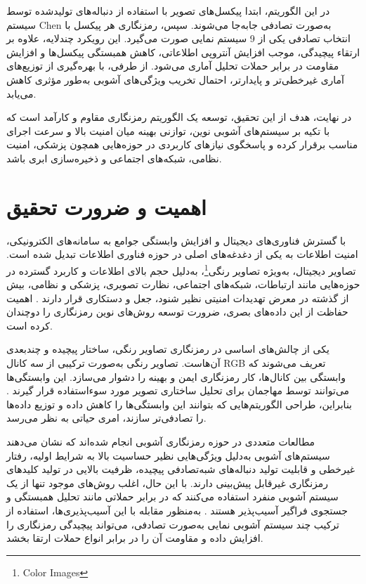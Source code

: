 \documentclass[a4paper,12pt]{report}
\renewcommand{\%}{\lr{\oldpercent}}
\providecommand{\lr}[1]{#1}
\providecommand{\LTRfootnote}[1]{\footnote{#1}}
\begin{document}
در این الگوریتم، ابتدا پیکسل‌های تصویر با استفاده از دنباله‌های تولیدشده توسط سیستم \lr{Chen} به‌صورت تصادفی جابه‌جا می‌شوند. سپس، رمزنگاری هر پیکسل با انتخاب تصادفی یکی از 9 سیستم نمایی صورت می‌گیرد. این رویکرد چندلایه، علاوه بر ارتقاء پیچیدگی، موجب افزایش آنتروپی اطلاعاتی، کاهش همبستگی پیکسل‌ها و افزایش مقاومت در برابر حملات تحلیل آماری می‌شود. از طرفی، با بهره‌گیری از توزیع‌های آماری غیرخطی‌تر و پایدارتر، احتمال تخریب ویژگی‌های آشوبی به‌طور مؤثری کاهش می‌یابد.

در نهایت، هدف از این تحقیق، توسعه یک الگوریتم رمزنگاری مقاوم و کارآمد است که با تکیه بر سیستم‌های آشوبی نوین، توازنی بهینه میان امنیت بالا و سرعت اجرای مناسب برقرار کرده و پاسخگوی نیازهای کاربردی در حوزه‌هایی همچون پزشکی، امنیت نظامی، شبکه‌های اجتماعی و ذخیره‌سازی ابری باشد.

\section{اهمیت و ضرورت تحقیق}
با گسترش فناوری‌های دیجیتال و افزایش وابستگی جوامع به سامانه‌های الکترونیکی، امنیت اطلاعات به یکی از دغدغه‌های اصلی در حوزه فناوری اطلاعات تبدیل شده است. تصاویر دیجیتال، به‌ویژه تصاویر رنگی\LTRfootnote{Color Images}، به‌دلیل حجم بالای اطلاعات و کاربرد گسترده در حوزه‌هایی مانند ارتباطات، شبکه‌های اجتماعی، نظارت تصویری، پزشکی و نظامی، بیش از گذشته در معرض تهدیدات امنیتی نظیر شنود، جعل و دستکاری قرار دارند \cite{ref10}. اهمیت حفاظت از این داده‌های بصری، ضرورت توسعه روش‌های نوین رمزنگاری را دوچندان کرده است.

یکی از چالش‌های اساسی در رمزنگاری تصاویر رنگی، ساختار پیچیده و چندبعدی آن‌هاست. تصاویر رنگی به‌صورت ترکیبی از سه کانال \lr{RGB} تعریف می‌شوند که وابستگی بین کانال‌ها، کار رمزنگاری ایمن و بهینه را دشوار می‌سازد. این وابستگی‌ها می‌توانند توسط مهاجمان برای تحلیل ساختاری تصویر مورد سوءاستفاده قرار گیرند \cite{ref3}. بنابراین، طراحی الگوریتم‌هایی که بتوانند این وابستگی‌ها را کاهش داده و توزیع داده‌ها را تصادفی‌تر سازند، امری حیاتی به نظر می‌رسد.

مطالعات متعددی در حوزه رمزنگاری آشوبی انجام شده‌اند که نشان می‌دهند سیستم‌های آشوبی به‌دلیل ویژگی‌هایی نظیر حساسیت بالا به شرایط اولیه، رفتار غیرخطی و قابلیت تولید دنباله‌های شبه‌تصادفی پیچیده، ظرفیت بالایی در تولید کلیدهای رمزنگاری غیرقابل پیش‌بینی دارند. با این حال، اغلب روش‌های موجود تنها از یک سیستم آشوبی منفرد استفاده می‌کنند که در برابر حملاتی مانند تحلیل همبستگی و جستجوی فراگیر آسیب‌پذیر هستند \cite{ref12}. به‌منظور مقابله با این آسیب‌پذیری‌ها، استفاده از ترکیب چند سیستم آشوبی نمایی به‌صورت تصادفی، می‌تواند پیچیدگی رمزنگاری را افزایش داده و مقاومت آن را در برابر انواع حملات ارتقا بخشد.
\end{document}
